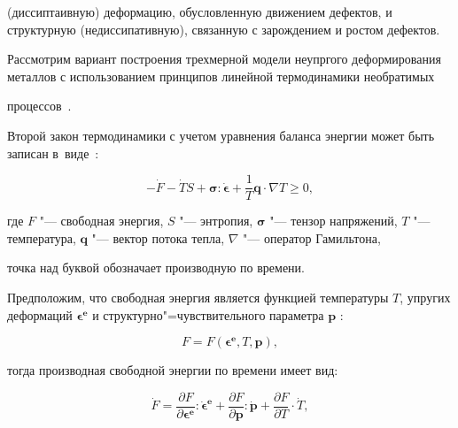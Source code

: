 (диссиптаивную) деформацию, обусловленную движением дефектов, и структурную (недиссипативную), связанную с зарождением и ростом дефектов.



\smallskip




Рассмотрим вариант построения трехмерной модели неупргого деформирования металлов с использованием принципов линейной термодинамики необратимых

процессов~\cite{kostina:bib:GlensdPrig}.



Второй закон термодинамики с учетом уравнения баланса энергии может быть записан в~виде~\cite{kostina:bib:RosakisRaviHodow}:

\begin{equation}

-\dot{F}-\dot{T}S+\boldsymbol{\sigma}:\boldsymbol{\dot{\epsilon}}+\frac{1}{T}\boldsymbol{q}\cdot\nabla{T}\geq0, \label{eq:kov:SecondLaw}

\end{equation}

где $F$ "--- свободная энергия, $S$ "---  энтропия, $\boldsymbol{\sigma}$ "--- тензор напряжений,  $T$ "---  температура, $\boldsymbol{q}$ "--- вектор потока тепла,  $\nabla$ "---  оператор Гамильтона,

точка над буквой обозначает производную по времени.



Предположим, что свободная энергия является функцией температуры  $T$, упругих деформаций $\boldsymbol{\epsilon^{e}}$  и структурно"=чувствительного параметра $\boldsymbol{p}$ :

$$

F=F(\boldsymbol{\epsilon^{e}}, T, \boldsymbol{p}),

$$

тогда производная свободной энергии по времени имеет вид:

\begin{equation}

\dot{F}=\frac{\partial F}{\partial{\boldsymbol{\epsilon^{e}}}}:\boldsymbol{\dot{\epsilon}^{e}}+\frac{\partial F}{\partial{\boldsymbol{p}}}:\dot{\boldsymbol{p}}+\frac{\partial F}{\partial T}\cdot\dot{T}, \label{eq:kov:FreeDot}

\end{equation}

